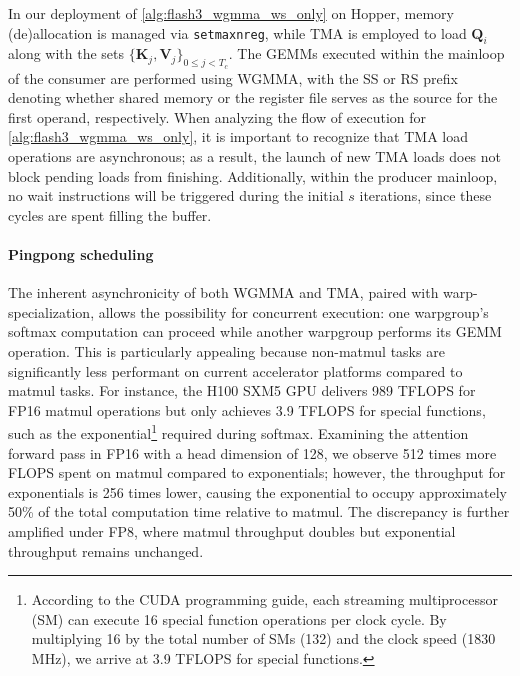 In our deployment of \cref{alg:flash3_wgmma_ws_only} on Hopper, memory (de)allocation is managed via \verb|setmaxnreg|, while TMA is employed to load $\mathbf{Q}_i$ along with the sets $\{\mathbf{K}_j, \mathbf{V}_j\}_{0 \leq j < T_c}$. The GEMMs executed within the mainloop of the consumer are performed using WGMMA, with the SS or RS prefix denoting whether shared memory or the register file serves as the source for the first operand, respectively. When analyzing the flow of execution for \cref{alg:flash3_wgmma_ws_only}, it is important to recognize that TMA load operations are asynchronous; as a result, the launch of new TMA loads does not block pending loads from finishing. Additionally, within the producer mainloop, no wait instructions will be triggered during the initial $s$ iterations, since these cycles are spent filling the buffer.

\paragraph{Pingpong scheduling} The inherent asynchronicity of both WGMMA and TMA, paired with warp-specialization, allows the possibility for concurrent execution: one warpgroup's softmax computation can proceed while another warpgroup performs its GEMM operation. This is particularly appealing because non-matmul tasks are significantly less performant on current accelerator platforms compared to matmul tasks. For instance, the H100 SXM5 GPU delivers 989 TFLOPS for FP16 matmul operations but only achieves 3.9 TFLOPS for special functions, such as the exponential\footnote{According to the CUDA programming guide, each streaming multiprocessor (SM) can execute 16 special function operations per clock cycle. By multiplying 16 by the total number of SMs (132) and the clock speed (1830 MHz), we arrive at 3.9 TFLOPS for special functions.} required during softmax. Examining the attention forward pass in FP16 with a head dimension of 128, we observe 512 times more FLOPS spent on matmul compared to exponentials; however, the throughput for exponentials is 256 times lower, causing the exponential to occupy approximately 50\% of the total computation time relative to matmul. The discrepancy is further amplified under FP8, where matmul throughput doubles but exponential throughput remains unchanged.

